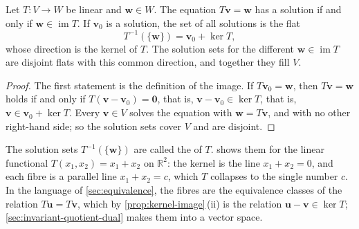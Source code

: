 \begin{proposition}
\label{prop:preimage-flat}
Let $T\colon V\to W$ be linear and $\mathbf w\in W$. The equation $T\mathbf v=\mathbf w$ has a solution if and only if $\mathbf w\in\operatorname{im}T$. If $\mathbf v_0$ is a solution, the set of all solutions is the flat
\[
T^{-1}(\{\mathbf w\})=\mathbf v_0+\ker T,
\]
whose direction is the kernel of $T$. The solution sets for the different $\mathbf w\in\operatorname{im}T$ are disjoint flats with this common direction, and together they fill $V$.
\end{proposition}

\begin{proof}
The first statement is the definition of the image. If $T\mathbf v_0=\mathbf w$, then $T\mathbf v=\mathbf w$ holds if and only if $T(\mathbf v-\mathbf v_0)=\mathbf 0$, that is, $\mathbf v-\mathbf v_0\in\ker T$, that is, $\mathbf v\in\mathbf v_0+\ker T$. Every $\mathbf v\in V$ solves the equation with $\mathbf w=T\mathbf v$, and with no other right-hand side; so the solution sets cover $V$ and are disjoint.
\end{proof}

The solution sets $T^{-1}(\{\mathbf w\})$ are called the  of $T$.  shows them for the linear functional $T(x_1,x_2)=x_1+x_2$ on $\mathbb R^2$: the kernel is the line $x_1+x_2=0$, and each fibre is a parallel line $x_1+x_2=c$, which $T$ collapses to the single number $c$. In the language of \cref{sec:equivalence}, the fibres are the equivalence classes of the relation $T\mathbf u=T\mathbf v$, which by \cref{prop:kernel-image}\,(ii) is the relation $\mathbf u-\mathbf v\in\ker T$; \cref{sec:invariant-quotient-dual} makes them into a vector space.

